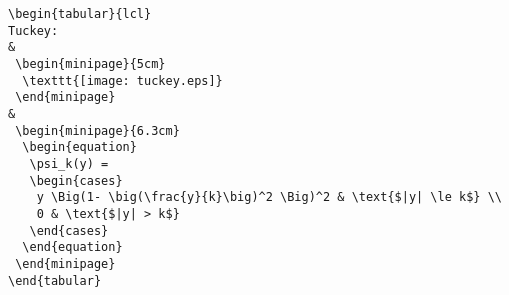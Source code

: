 \documentclass[letterpaper,12pt]{article}
\begin{document}
\pagestyle{empty}
\thispagestyle{empty}

\noindent

\begin{verbatim}
\begin{tabular}{lcl}
Tuckey: 
&
 \begin{minipage}{5cm}
  \texttt{[image: tuckey.eps]}
 \end{minipage}
&
 \begin{minipage}{6.3cm}
  \begin{equation}
   \psi_k(y) =
   \begin{cases}
    y \Big(1- \big(\frac{y}{k}\big)^2 \Big)^2 & \text{$|y| \le k$} \\
    0 & \text{$|y| > k$}
   \end{cases}
  \end{equation}
 \end{minipage}
\end{tabular}
\end{verbatim}
\end{document}
